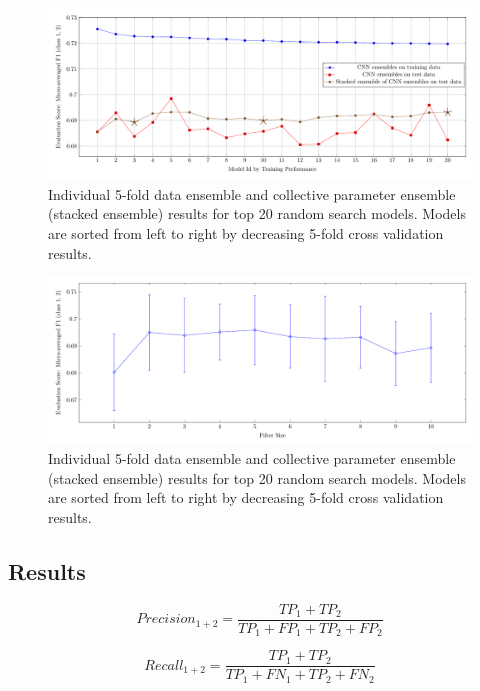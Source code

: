 \documentclass[conference]{IEEEtran}
\begin{document}
\begin{figure}[htbp]
	\centering
	\includegraphics[scale=0.65]{ensemble_plot.pdf}
	\caption{Individual 5-fold data ensemble and collective parameter ensemble (stacked ensemble) results for top 20 random search models. Models are sorted from left to right by decreasing 5-fold cross validation results. }
	\label{plot_ensemble_eval}
\end{figure}

\begin{figure}[htbp]
	\centering
	\includegraphics[scale=0.65]{filter_plot.pdf}
	\caption{Individual 5-fold data ensemble and collective parameter ensemble (stacked ensemble) results for top 20 random search models. Models are sorted from left to right by decreasing 5-fold cross validation results. }
	\label{plot_ensemble_eval}
\end{figure}

\subsection{Results \label{results}}

\begin{equation}
Precision_{1 + 2} = \frac{TP_{1} + TP_{2}}{TP_{1} + FP_{1} + TP_{2} + FP_{2}}
\end{equation}

\begin{equation}
Recall_{1 + 2} = \frac{TP_{1} + TP_{2}}{TP_{1} + FN_{1} + TP_{2} + FN_{2}}
\end{equation}
\end{document}

